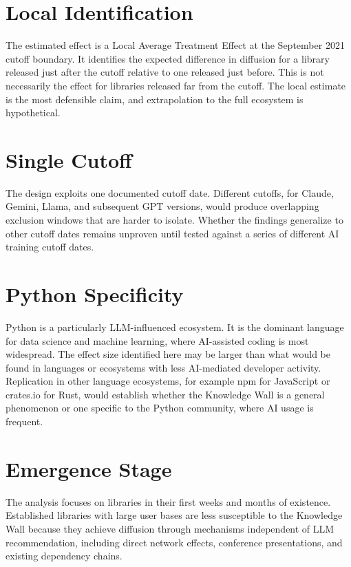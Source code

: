 \documentclass[12pt, a4paper]{report}
\begin{document}
\section*{Local Identification}
The estimated effect is a Local Average Treatment Effect at the September 2021 cutoff boundary. It identifies the expected difference in diffusion for a library released just after the cutoff relative to one released just before. This is not necessarily the effect for libraries released far from the cutoff. The local estimate is the most defensible claim, and extrapolation to the full ecosystem is hypothetical.

\section*{Single Cutoff}
The design exploits one documented cutoff date. Different cutoffs, for Claude, Gemini, Llama, and subsequent GPT versions, would produce overlapping exclusion windows that are harder to isolate. Whether the findings generalize to other cutoff dates remains unproven until tested against a series of different AI training cutoff dates.

\section*{Python Specificity}
Python is a particularly LLM-influenced ecosystem. It is the dominant language for data science and machine learning, where AI-assisted coding is most widespread. The effect size identified here may be larger than what would be found in languages or ecosystems with less AI-mediated developer activity. Replication in other language ecosystems, for example npm for JavaScript or crates.io for Rust, would establish whether the Knowledge Wall is a general phenomenon or one specific to the Python community, where AI usage is frequent.

\section*{Emergence Stage}
The analysis focuses on libraries in their first weeks and months of existence. Established libraries with large user bases are less susceptible to the Knowledge Wall because they achieve diffusion through mechanisms independent of LLM recommendation, including direct network effects, conference presentations, and existing dependency chains.
\end{document}
